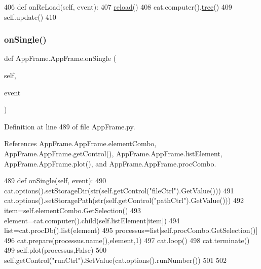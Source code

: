 \begin{DoxyCode}
406     \textcolor{keyword}{def }onReLoad(self, event):
407         \hyperlink{namespaceshell_a406c1a03890c85fe979d6d8e540b3bdf}{reload}()
408         cat.computer().\hyperlink{namespacetree}{tree}()
409         self.update()
410 
\end{DoxyCode}
\mbox{\label{classAppFrame_1_1AppFrame_ad84cc70dd583d651f0b8eded860340a8}} 
\subsubsection{\texorpdfstring{on\+Single()}{onSingle()}}
{\footnotesize\ttfamily def App\+Frame.\+App\+Frame.\+on\+Single (\begin{DoxyParamCaption}\item[{}]{self,  }\item[{}]{event }\end{DoxyParamCaption})}



Definition at line 489 of file App\+Frame.\+py.



References App\+Frame.\+App\+Frame.\+element\+Combo, App\+Frame.\+App\+Frame.\+get\+Control(), App\+Frame.\+App\+Frame.\+list\+Element, App\+Frame.\+App\+Frame.\+plot(), and App\+Frame.\+App\+Frame.\+proc\+Combo.


\begin{DoxyCode}
489     \textcolor{keyword}{def }onSingle(self, event):
490         cat.options().setStorageDir(str(self.getControl(\textcolor{stringliteral}{"fileCtrl"}).GetValue()))
491         cat.options().setStoragePath(str(self.getControl(\textcolor{stringliteral}{"pathCtrl"}).GetValue()))
492         item=self.elementCombo.GetSelection()
493         element=cat.computer().child(self.listElement[item])
494         list=cat.procDb().list(element)
495         processus=list[self.procCombo.GetSelection()]
496         cat.prepare(processus.name(),element,1)
497         cat.loop()
498         cat.terminate()
499         self.plot(processus,\textcolor{keyword}{False})
500         self.getControl(\textcolor{stringliteral}{"runCtrl"}).SetValue(cat.options().runNumber())
501 
502 
\end{DoxyCode}
\mbox{\label{classAppFrame_1_1AppFrame_a9816dbc13e8b6c54d11532e2bf53eb86}} 
